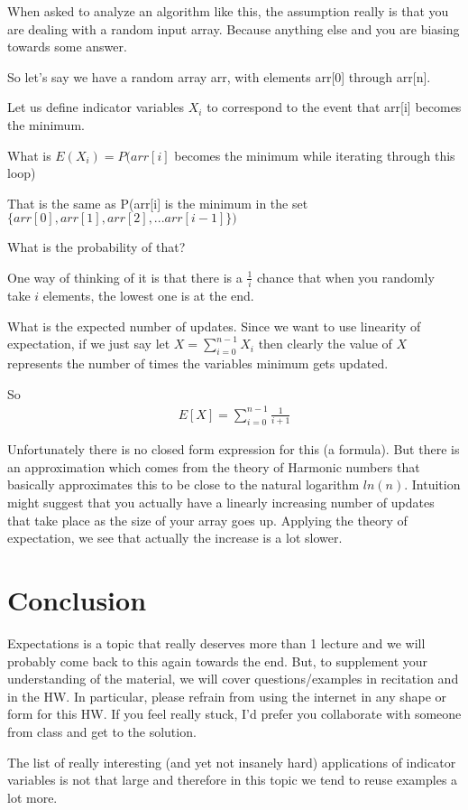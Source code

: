 \documentclass[12pt]{article}
\begin{document}
When asked to analyze an algorithm like this, the assumption really is that you are dealing with a random input array. Because anything else and you are biasing towards some answer.

So let's say we have a random array arr, with elements arr[0] through arr[n].

Let us define indicator variables $X_i$ to correspond to the event that arr[i] becomes the minimum. 

What is $E(X_i) = P(arr[i]$ becomes the minimum while iterating through this loop)

That is the same as P(arr[i] is the minimum in the set 
$\{arr[0], arr[1], arr[2],...arr[i-1]\})$
 
What is the probability of that? 

One way of thinking of it is that there is a $\frac{1}{i}$ chance that when you randomly take $i$ elements, the lowest one is at the end. 

What is the expected number of updates. Since we want to use linearity of expectation, if we 
just say let $\displaystyle X = \sum_{i=0}^{n-1}X_i$ then clearly the value of $X$ represents the number of times the variables minimum gets updated.

So
\begin{align*}
E[X] = \sum_{i=0}^{n-1} \frac{1}{i+1} 
\end{align*} 

Unfortunately there is no closed form expression for this (a formula). But there is an approximation which comes from the theory of Harmonic numbers that basically approximates this to be close to the natural logarithm $ln(n)$. Intuition might suggest that you actually have a linearly increasing number of updates that take place as the size of your array goes up. Applying the theory of expectation, we see that actually the increase is a lot slower.

\section*{Conclusion}
Expectations is a topic that really deserves more than 1 lecture and we will probably come back to this again towards the end. But, to supplement your understanding of the material, we will cover questions/examples in recitation and in the HW. In particular, please refrain from using the internet in any shape or form for this HW. If you feel really stuck, I'd prefer you collaborate with someone from class and get to the solution. 

The list of really interesting (and yet not insanely hard) applications of indicator variables is not that large and therefore in this topic we tend to reuse examples a lot more. 
\end{document}
